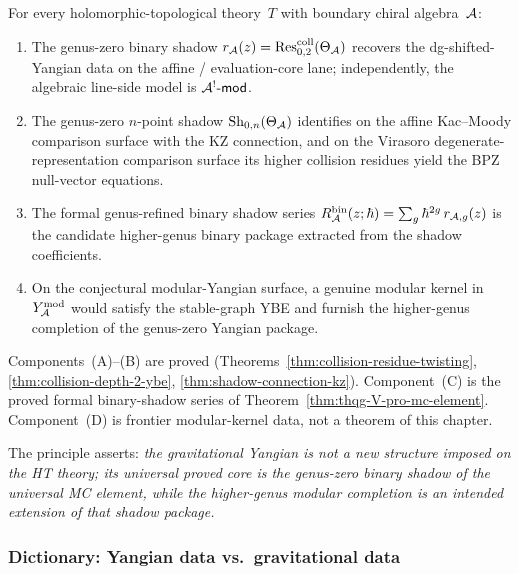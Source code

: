 \begin{principle}
\label{princ:thqg-V-yangian-shadow}
For every holomorphic-topological theory~$T$ with boundary chiral
algebra~$\mathcal{A}$:
\begin{enumerate}[label=\textup{(\Alph*)}]
\item The genus-zero binary shadow
 $r_{\mathcal{A}}(z) = \operatorname{Res}^{\mathrm{coll}}_{0,2}(\Theta_{\mathcal{A}})$ recovers the
 dg-shifted-Yangian data on the affine / evaluation-core lane;
 independently, the algebraic line-side model is
 $\mathcal{A}^!\text{-}\mathsf{mod}$.
\item The genus-zero $n$-point shadow
 $\operatorname{Sh}_{0,n}(\Theta_{\mathcal{A}})$ identifies on the affine Kac--Moody
 comparison surface with the KZ connection, and on the Virasoro
 degenerate-representation comparison surface its higher collision
 residues yield the BPZ null-vector equations.
\item The formal genus-refined binary shadow series
 $R^{\mathrm{bin}}_{\mathcal{A}}(z;\hbar) =
 \sum_g \hbar^{2g}\,r_{\mathcal{A},g}(z)$ is the candidate higher-genus
 binary package extracted from the shadow coefficients.
\item On the conjectural modular-Yangian surface, a genuine modular
 kernel in $Y^{\mathrm{mod}}_{\mathcal{A}}$ would satisfy the stable-graph YBE and furnish
 the higher-genus completion of the genus-zero Yangian package.
\end{enumerate}
Components~(A)--(B) are proved
\textup{(}Theorems~\textup{\ref{thm:collision-residue-twisting}},
\textup{\ref{thm:collision-depth-2-ybe}},
\textup{\ref{thm:shadow-connection-kz})}.
Component~(C) is the proved formal binary-shadow series of
Theorem~\textup{\ref{thm:thqg-V-pro-mc-element}}.
Component~(D) is frontier modular-kernel data, not a theorem of this
chapter.

The principle asserts: \emph{the gravitational Yangian is not a new
structure imposed on the HT theory; its universal proved core is the
genus-zero binary shadow of the universal MC element, while the
higher-genus modular completion is an intended extension of that
shadow package.}
\end{principle}


\subsubsection{Dictionary: Yangian data vs.\ gravitational data}

